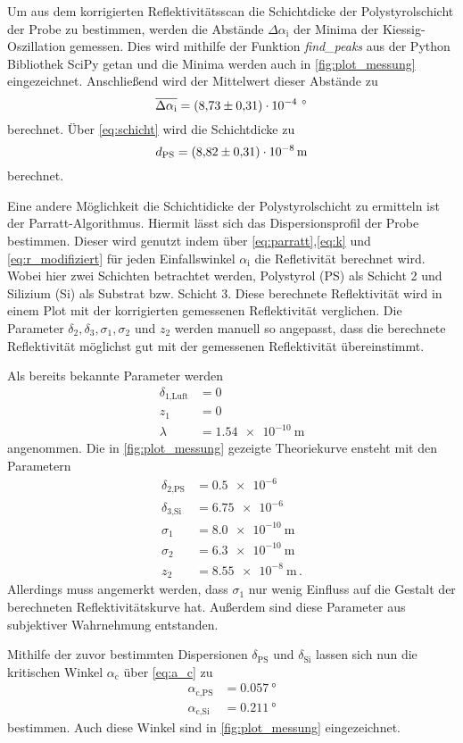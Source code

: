 Um aus dem korrigierten Reflektivitätsscan die Schichtdicke der Polystyrolschicht der Probe zu bestimmen,
werden die Abstände $\Delta\alpha_\text{i}$ der Minima der Kiessig-Oszillation gemessen.
Dies wird mithilfe der Funktion \textit{find\_peaks} aus der Python Bibliothek SciPy getan
und die Minima werden auch in \autoref{fig:plot_messung} eingezeichnet.\cite{scipy}
Anschließend wird der Mittelwert dieser Abstände zu
\begin{equation*}
    \overline{\Delta\alpha_\text{i}} = \SI{8.73+-0.31e-4}{\,\degree}
\end{equation*}
berechnet.
Über \autoref{eq:schicht} wird die Schichtdicke zu 
\begin{equation*}
    d_\text{PS} = \SI{8.82+-0.31e-08}{\meter}
\end{equation*}
berechnet.

Eine andere Möglichkeit die Schichtidicke der Polystyrolschicht zu ermitteln ist der Parratt-Algorithmus.
Hiermit lässt sich das Dispersionsprofil der Probe bestimmen.
Dieser wird genutzt indem über \autoref{eq:parratt},\ref{eq:k} und \ref{eq:r_modifiziert} für jeden Einfallswinkel $\alpha_\text{i}$ die Refletivität berechnet wird.
Wobei hier zwei Schichten betrachtet werden, Polystyrol (PS) als Schicht 2 und Silizium (Si) als Substrat bzw. Schicht 3.
Diese berechnete Reflektivität wird in einem Plot mit der korrigierten gemessenen Reflektivität verglichen.
Die Parameter $\delta_2,\delta_3,\sigma_1,\sigma_2$ und $z_2$ werden manuell so angepasst,
dass die berechnete Reflektivität möglichst gut mit der gemessenen Reflektivität übereinstimmt.

Als bereits bekannte Parameter werden 
\begin{align*}
    \delta_\text{1,Luft} &= 0 \\
    z_1 &= 0 \\
    \lambda &= \SI{1.54e-10}{\meter}
\end{align*}
angenommen. 
Die in \autoref{fig:plot_messung} gezeigte Theoriekurve ensteht mit den Parametern
\begin{align*}
    \delta_\text{2,PS} &= \num{0.5e-6} \\
    \delta_\text{3,Si} &= \num{6.75e-6} \\
    \sigma_1 &= \SI{8.0e-10}{\meter} \\
    \sigma_2 &= \SI{6.3e-10}{\meter} \\
    z_2 &= \SI{8.55e-8}{\meter} \, .
\end{align*}
Allerdings muss angemerkt werden, dass $\sigma_1$ nur wenig Einfluss auf die Gestalt der berechneten Reflektivitätskurve hat.
Außerdem sind diese Parameter aus subjektiver Wahrnehmung entstanden.

Mithilfe der zuvor bestimmten Dispersionen $\delta_\text{PS}$ und $\delta_\text{Si}$ 
lassen sich nun die kritischen Winkel $\alpha_\text{c}$ über \autoref{eq:a_c} zu
\begin{align*}
    \alpha_\text{c,PS} &= \SI{0.057}{\degree} \\
    \alpha_\text{c,Si} &= \SI{0.211}{\degree}
\end{align*}
bestimmen. 
Auch diese Winkel sind in \autoref{fig:plot_messung} eingezeichnet.


